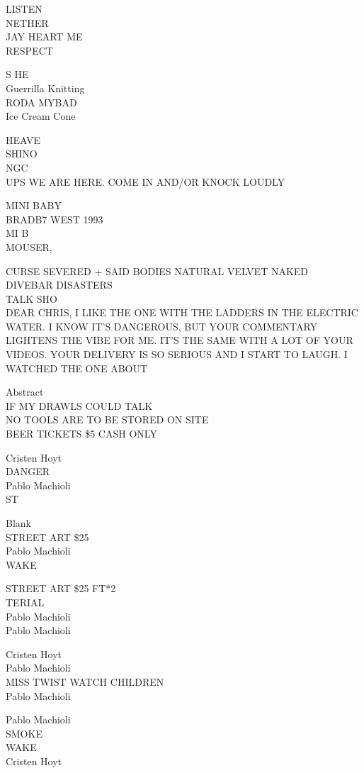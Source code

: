 \documentclass[10pt,letterpaper]{article}
\begin{document}
LISTEN\\
NETHER\\
JAY HEART ME\\
RESPECT

S HE\\
Guerrilla Knitting\\
RODA MYBAD\\
Ice Cream Cone

HEAVE\\
SHINO\\
NGC\\
UPS WE ARE HERE.  COME IN AND/OR KNOCK LOUDLY

MINI BABY\\
BRADB7 WEST 1993\\
MI B\\
MOUSER,

CURSE SEVERED  + SAID BODIES NATURAL VELVET NAKED\\
DIVEBAR DISASTERS\\
TALK SHO\\
DEAR CHRIS, I LIKE THE ONE WITH THE LADDERS IN THE ELECTRIC WATER.  I KNOW IT'S DANGEROUS, BUT YOUR COMMENTARY LIGHTENS THE VIBE FOR ME.  IT'S THE SAME WITH A LOT OF YOUR VIDEOS.  YOUR DELIVERY IS SO SERIOUS AND I START TO LAUGH.  I WATCHED THE ONE ABOUT

Abstract\\
IF MY DRAWLS COULD TALK\\
NO TOOLS ARE TO BE STORED ON SITE\\
BEER TICKETS \$5 CASH ONLY

Cristen Hoyt\\
DANGER\\
Pablo Machioli\\
ST

Blank\\
STREET ART \$25\\
Pablo Machioli\\
WAKE

STREET ART \$25 FT*2\\
TERIAL\\
Pablo Machioli\\
Pablo Machioli

Cristen Hoyt\\
Pablo Machioli\\
MISS TWIST WATCH CHILDREN\\
Pablo Machioli

Pablo Machioli\\
SMOKE\\
WAKE\\
Cristen Hoyt
\end{document}

